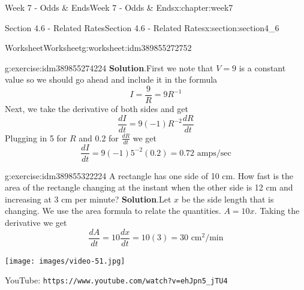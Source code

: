 \documentclass[oneside,10pt,]{book}
\newcommand{\blocktitlefont}{\relax}
\newcommand{\mono}[1]{\texttt{#1}}
\numberwithin{equation}{section}
\newlength{\qrsize}
\newlength{\previewwidth}
\begin{document}
\begin{chapterptx}{Week 7 - Odds \& Ends}{}{Week 7 - Odds \& Ends}{}{}{x:chapter:week7}
\begin{sectionptx}{Section 4.6 - Related Rates}{}{Section 4.6 - Related Rates}{}{}{x:section:section4_6}
\begin{worksheet-subsection}{Worksheet}{}{Worksheet}{}{}{g:worksheet:idm389855272752}
\begin{divisionexercise}{1}{}{}{g:exercise:idm389855274224}
\textbf{\blocktitlefont Solution}.\hypertarget{g:solution:idm389855302592}{}\quad{}First we note that \(V=9\) is a constant value so we should go ahead and include it in the formula%
\begin{equation*}
I = \frac 9R = 9R^{-1} 
\end{equation*}
Next, we take the derivative of both sides and get%
\begin{equation*}
\frac{dI}{dt} = 9(-1)R^{-2}\frac{dR}{dt} 
\end{equation*}
Plugging in 5 for \(R\) and 0.2 for \(\frac{dR}{dt}\) we get%
\begin{equation*}
\frac{dI}{dt} = 9(-1)5^{-2}(0.2) = 0.72 \text{ amps/sec}
\end{equation*}
%
\end{divisionexercise}%
%
\begin{divisionexercise}{2}{}{}{g:exercise:idm389855322224}%
A rectangle has one side of 10 cm. How fast is the area of the rectangle changing at the instant when the other side is 12 cm and increasing at 3 cm per minute?%
\textbf{\blocktitlefont Solution}.\hypertarget{g:solution:idm389855324368}{}\quad{}Let \(x\) be the side length that is changing. We use the area formula to relate the quantities. \(A=10x\). Taking the derivative we get%
\begin{equation*}
\frac{dA}{dt} = 10 \frac{dx}{dt} = 10(3) = 30 \text{ cm}^2\text{/min}
\end{equation*}
%
\end{divisionexercise}%
\end{worksheet-subsection}
\restoregeometry
\setlength{\qrsize}{9em}
\setlength{\previewwidth}{\linewidth}
\addtolength{\previewwidth}{-\qrsize}
\begin{tcbraster}[raster columns=2, raster column skip=1pt, raster halign=center, raster force size=false, raster left skip=0pt, raster right skip=0pt]%
\begin{tcolorbox}[previewstyle, width=\previewwidth]%
\texttt{[image: images/video-51.jpg]}%
\end{tcolorbox}%
\begin{tcolorbox}[qrstyle]%
{\hypersetup{urlcolor=black}}%
\end{tcolorbox}%
\begin{tcolorbox}[captionstyle]%
\small YouTube: \mono{https://www.youtube.com/watch?v=ehJpn5\_jTU4}\end{tcolorbox}%
\end{tcbraster}%
\end{sectionptx}
\end{chapterptx}
\end{document}
